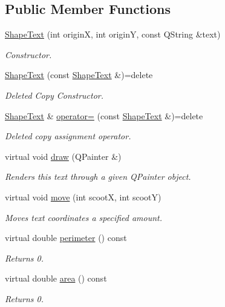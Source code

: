 \subsection*{Public Member Functions}
\begin{DoxyCompactItemize}
\item 
\mbox{\hyperlink{class_shape_text_ab05926268592835c6b3dae338ac0066d}{Shape\+Text}} (int originX, int originY, const Q\+String \&text)
\begin{DoxyCompactList}\small\item\em Constructor. \end{DoxyCompactList}\item 
\mbox{\hyperlink{class_shape_text_a7a0ed54eebed7e3e0b0a8c7139a22aa7}{Shape\+Text}} (const \mbox{\hyperlink{class_shape_text}{Shape\+Text}} \&)=delete
\begin{DoxyCompactList}\small\item\em Deleted Copy Constructor. \end{DoxyCompactList}\item 
\mbox{\hyperlink{class_shape_text}{Shape\+Text}} \& \mbox{\hyperlink{class_shape_text_a420d8e795e693a4e9f087786152f931a}{operator=}} (const \mbox{\hyperlink{class_shape_text}{Shape\+Text}} \&)=delete
\begin{DoxyCompactList}\small\item\em Deleted copy assignment operator. \end{DoxyCompactList}\item 
virtual void \mbox{\hyperlink{class_shape_text_a554bed75c86d0ca7d555eefbc7aff7dc}{draw}} (Q\+Painter \&)
\begin{DoxyCompactList}\small\item\em Renders this text through a given Q\+Painter object. \end{DoxyCompactList}\item 
virtual void \mbox{\hyperlink{class_shape_text_ae7b73f317077c9873f4bd59c98b89c60}{move}} (int scootX, int scootY)
\begin{DoxyCompactList}\small\item\em Moves text coordinates a specified amount. \end{DoxyCompactList}\item 
virtual double \mbox{\hyperlink{class_shape_text_a76550783952e8dc25f187cd4996ebf2b}{perimeter}} () const
\begin{DoxyCompactList}\small\item\em Returns 0. \end{DoxyCompactList}\item 
virtual double \mbox{\hyperlink{class_shape_text_a0aad29654b21ec4dc1990df2c236b2da}{area}} () const
\begin{DoxyCompactList}\small\item\em Returns 0. \end{DoxyCompactList}\end{DoxyCompactItemize}
